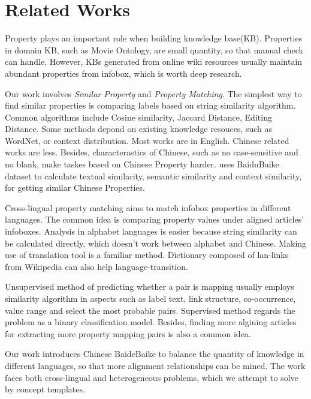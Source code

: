 \documentclass[runningheads,a4paper]{llncs}
\begin{document}
\section{Related Works}
Property plays an important role when building knowledge base(KB). Properties in domain KB, such as Movie Ontology, are small quantity, so that manual check can handle\cite{wang:movie}. However, KBs generated from online wiki resources usually maintain abundant properties from infobox, which is worth deep research. 

Our work involves \textit{Similar Property} and \textit{Property Matching}. The simplest way to find similar properties is comparing labels based on string similarity algorithm. Common algorithms include Cosine similarity, Jaccard Distance, Editing Distance. Some methods depond on existing knowledge resouces, such as WordNet\cite{yang2005measuring}, or context distribution\cite{pantel2009web}. Most works are in English. Chinese related works are less. Besides, characterastics of Chinese, such as no case-sensitive and no blank, make taskes based on Chinese Property harder. \cite{liu2014extracting} uses BaiduBaike dataset to calculate textual similarity, semantic similarity and context similarity, for getting similar Chinese Properties.

Cross-lingual property matching aims to match infobox properties in different languages. The common idea is comparing property values under aligned articles' infoboxes. Analysis in alphabet languages is easier because string similarity can be calculated directly\cite{bouma2009cross}, which doesn't work between alphabet and Chinese. Making use of translation tool is a familiar method\cite{fu2009cross}. Dictionary composed of lan-links from Wikipedia can also help language-transition\cite{nguyen2011multilingual}.  

Unsupervised method of predicting whether a pair is mapping usually employs similarity algorithm in aspects such as label text, link structure, co-occurrence, value range and select the most probable pairs\cite{nguyen2011multilingual, lin2011unsupervised}. Supervised method regards the problem as a binary classification model\cite{adar2009information}. Besides, finding more algining articles for extracting more property mapping pairs is also a common idea\cite{rinser2013cross}.

Our work introduces Chinese BaideBaike to balance the quantity of knowledge in different languages, so that more alignment relationships can be mined. The work faces both cross-lingual and heterogeneous problems, which we attempt to solve by concept templates.
\end{document}
